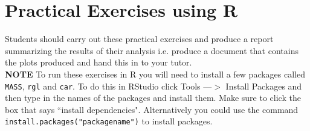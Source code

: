 \documentclass[answers]{exam}
\begin{document}
\begin{questions}
\begin{subparts}
\end{subparts}

\end{questions}



\section*{Practical Exercises using R}
Students should carry out these practical exercises and produce a report summarizing the results of their analysis i.e. produce a document that contains the plots produced and hand this in to your tutor.\\
\textbf{NOTE} To run these exercises in R you will need to install a few packages called \texttt{MASS}, \texttt{rgl} and \texttt{car}. To do this in RStudio click Tools ---$>$ Install Packages and then type in the names of the packages and install them. Make sure to click the box that says ``install dependencies". Alternatively you could use the command \texttt{install.packages("packagename")} to install packages.
\end{document}
